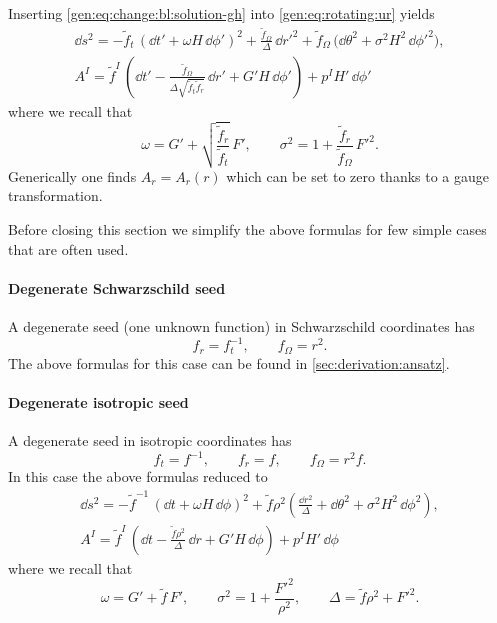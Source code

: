 Inserting \eqref{gen:eq:change:bl:solution-gh} into \eqref{gen:eq:rotating:ur} yields
\begin{subequations}
\label{gen:eq:rotating:tr}
\begin{gather}
	\dd s^2 = - \tilde f_t\, (\dd t' + \omega H\, \dd\phi' )^2
		+ \frac{\tilde f_\Omega}{\Delta}\, \dd r'^2
		+ \tilde f_\Omega\, \big(\dd\theta^2 + \sigma^2 H^2\, \dd\phi'^2 \big), \\
	A^I = \tilde f^I\, \left(\dd t' - \frac{\tilde f_\Omega}{\Delta \sqrt{\tilde f_t \tilde f_r}}\, \dd r' + G' H\, \dd \phi' \right) + p^I H'\, \dd\phi'
\end{gather}
\end{subequations}
where we recall that
\begin{equation}
	\omega = G' + \sqrt{\frac{\tilde f_r}{\tilde f_t}}\, F', \qquad
	\sigma^2 = 1 + \frac{\tilde f_r}{\tilde f_\Omega}\, F'^2.
\end{equation} 
Generically one finds $A_r = A_r(r)$ which can be set to zero thanks to a gauge transformation.

Before closing this section we simplify the above formulas for few simple cases that are often used.


\paragraph{Degenerate Schwarzschild seed}

A degenerate seed (one unknown function) in Schwarzschild coordinates has
\begin{equation}
	f_r = f_t^{-1}, \qquad
	f_\Omega = r^2.
\end{equation} 
The above formulas for this case can be found in \cref{sec:derivation:ansatz}.


\paragraph{Degenerate isotropic seed}

A degenerate seed in isotropic coordinates has
\begin{equation}
	f_t = f^{-1}, \qquad
	f_r = f, \qquad
	f_\Omega = r^2 f.
\end{equation} 
In this case the above formulas reduced to
\begin{subequations}
\label{gen:eq:rotating:tr-degenerate-isotropic}
\begin{gather}
	\dd s^2 = - \tilde f^{-1}\, (\dd t + \omega H\, \dd\phi )^2
		+ \tilde f \rho^2 \left( \frac{\dd r^2}{\Delta}
			+ \dd\theta^2 + \sigma^2 H^2\, \dd\phi^2 \right), \\
	A^I = \tilde f^I\, \left(\dd t - \frac{\tilde f \rho^2}{\Delta}\, \dd r + G' H\, \dd \phi \right) + p^I H'\, \dd\phi
\end{gather}
\end{subequations}
where we recall that
\begin{equation}
	\omega = G' + \tilde f\, F', \qquad
	\sigma^2 = 1 + \frac{F'^2}{\rho^2}, \qquad
	\Delta = \tilde f \rho^2 + F'^2.
\end{equation} 

